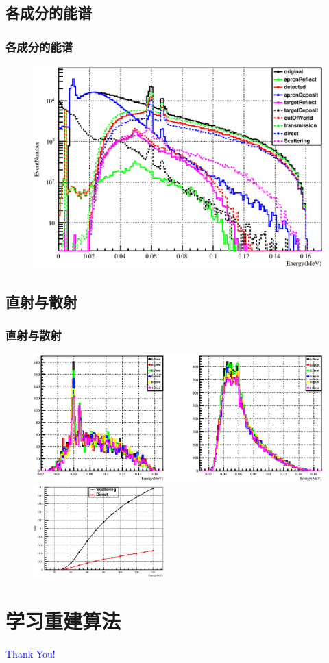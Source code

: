 \documentclass{beamer}
\newcommand{\yihao}{\fontsize{30pt}{\baselineskip}\selectfont}
\newcommand{\ThankYouPage}{
  \begin{frame}
    \yihao \centering \textcolor{blue}
    {Thank You!}
  \end{frame}
}
\begin{document}
\begin{CJK*}{UTF8}{gkai}
  \subsection{各成分的能谱}
  \begin{frame}\frametitle{各成分的能谱}
    \begin{figure}[ht]
      \includegraphics[width=\textwidth]{1mmTiApron160keVelectronEnergySpectrum.eps}
    \end{figure}
  \end{frame}
  \subsection{直射与散射}
  \begin{frame}\frametitle{直射与散射}
    \begin{figure}[ht]
      \includegraphics[width=\textwidth]{TiApron160keVelectronXraydirectandscat.eps}

      \includegraphics[width=0.45\textwidth]{ScatDirectRatio.eps}
    \end{figure}
  \end{frame}
  \section{学习重建算法}
  \ThankYouPage
\end{CJK*}
\end{document}
